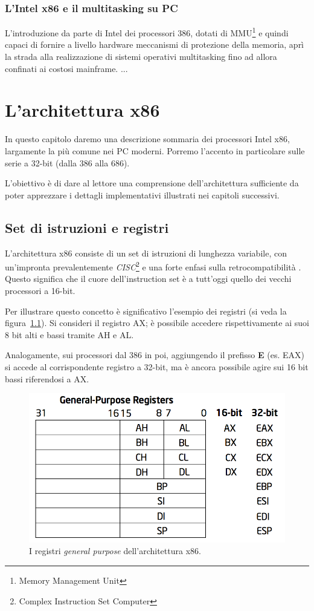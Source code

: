 \documentclass[12pt,a4paper]{report}
\begin{document}
		\subsection{L'Intel x86 e il multitasking su PC}
			L'introduzione da parte di Intel dei processori 386, dotati di MMU\footnote{Memory Management Unit} e quindi capaci di fornire a
			livello hardware meccanismi di protezione della memoria, aprì la strada alla realizzazione di sistemi operativi multitasking
			fino ad allora confinati ai costosi mainframe.
			...

\chapter{L'architettura x86}
	In questo capitolo daremo una descrizione sommaria dei processori Intel x86, largamente la più comune nei PC moderni.
	Porremo l'accento in particolare sulle serie a 32-bit (dalla 386 alla 686).
	
	L'obiettivo è di dare al lettore una comprensione dell'architettura sufficiente da poter apprezzare i dettagli implementativi
	illustrati nei capitoli successivi.
	
	\section{Set di istruzioni e registri}
		L'architettura x86 consiste di un set di istruzioni di lunghezza variabile, con un'impronta prevalentemente
		\emph{CISC}\footnote{Complex Instruction Set Computer} e una forte enfasi sulla retrocompatibilità \cite{WIKI_x86}.
		Questo significa che il cuore dell'instruction set è a tutt'oggi quello dei vecchi processori a 16-bit.
		
		Per illustrare questo concetto è significativo l'esempio dei registri (si veda la figura~\ref{fig:gpr}).
		Si consideri il registro AX; è possibile accedere rispettivamente ai suoi 8 bit alti e bassi tramite AH e AL.
		
		Analogamente, sui processori dal 386 in poi, aggiungendo il prefisso \textbf{E} (es. EAX) si accede al corrispondente
		registro a 32-bit, ma è ancora possibile agire sui 16 bit bassi riferendosi a AX.
		
		\begin{figure}[t]
		\centering
		\includegraphics[scale=0.6]{img/gpr.png}
		\caption{I registri \emph{general purpose} dell'architettura x86. \cite{Intel}\label{fig:gpr}}
		\end{figure}
\end{document}
